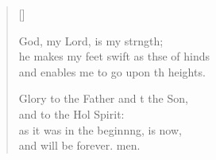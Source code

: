 \begin{verse}[\versewidth]
\begin{patverse}
God, my Lord, is my strngth;\Flex\\
he makes my feet swift as thse of hinds\Med\\
and enables me to go upon th heights.

Glory to the Father and t the Son,\Med\\
and to the Hol Spirit:\\
as it was in the beginn\pointup{\i}ng, is now,\Med\\
and will be forever. men. 
  \end{patverse}
\end{verse}
